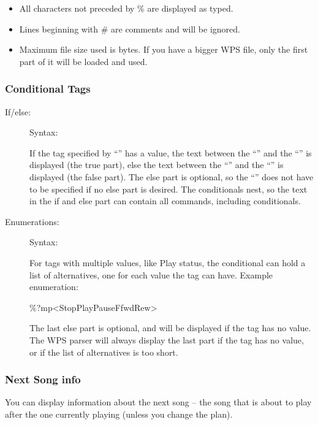\begin{itemize}
\item All characters not preceded by \% are displayed as typed.
\item Lines beginning with \# are comments and will be ignored.
\item Maximum file size used is 
   bytes.
  If you have a bigger WPS file, only the first part of it will be 
  loaded and used.
\end{itemize}

\subsubsection{Conditional Tags}

\begin{description}
\item[If/else: ]
Syntax: 

If the tag specified by ``'' has a value, the text between the 
``\config{{\textless}}'' and the ``\config{{\textbar}}'' is displayed (the true
part), else the text between the ``\config{{\textbar}}'' and the 
``\config{{\textgreater}}'' is displayed (the false part).
The else part is optional, so the ``\config{{\textbar}}'' does not have to be 
specified if no else part is desired. The conditionals nest, so the text in the
if and else part can contain all \config{\%} commands, including conditionals.

\item[Enumerations: ]
Syntax: 

For tags with multiple values, like Play status, the conditional can hold a 
list of alternatives, one for each value the tag can have.
Example enumeration: 
\begin{example}
  \%?mp{\textless}Stop{\textbar}Play{\textbar}Pause{\textbar}Ffwd{\textbar}Rew{\textgreater}
\end{example}

The last else part is optional, and will be displayed if the tag has no value. 
The WPS parser will always display the last part if the tag has no value, or if
the list of alternatives is too short.
\end{description}

\subsubsection{Next Song info}
You can display information about the next song -- the song that is
about to play after the one currently playing (unless you change the
plan).

